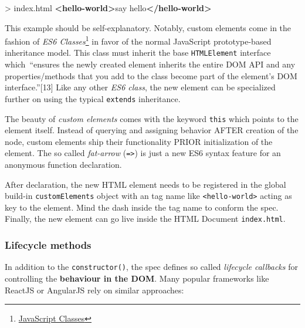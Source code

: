 \documentclass[]{article}
\newenvironment{Shaded}{}{}
\newcommand{\KeywordTok}[1]{\textcolor[rgb]{0.00,0.44,0.13}{\textbf{{#1}}}}
\newcommand{\NormalTok}[1]{{#1}}
\begin{document}
\begin{Shaded}
\begin{Highlighting}[]
\NormalTok{> index.html}
\KeywordTok{<hello-world>}\NormalTok{say hello}\KeywordTok{</hello-world>}
\end{Highlighting}
\end{Shaded}

This example should be self-explanatory. Notably, custom elements come
in the fashion of \emph{ES6 Classes}\footnote{\href{https://developer.mozilla.org/en/docs/Web/JavaScript/Reference/Classes}{JavaScript
  Classes}} in favor of the normal JavaScript prototype-based
inheritance model. This class must inherit the base \texttt{HTMLElement}
interface which~``ensures the newly created element inherits the entire
DOM API and any properties/methods that you add to the class become part
of the element's DOM interface.''{[}13{]} Like any other \emph{ES6
class}, the new element can be specialized further on using the typical
\texttt{extends} inheritance.

The beauty of \emph{custom elements} comes with the keyword
\texttt{this} which points to the element itself. Instead of querying
and assigning behavior AFTER creation of the node, custom elements ship
their functionality PRIOR initialization of the element. The so called
\emph{fat-arrow} (\texttt{=\textgreater{}}) is just a new ES6 syntax
feature for an anonymous function declaration.

After declaration, the new HTML element needs to be registered in the
global build-in \texttt{customElements} object with an tag name like
\texttt{\textless{}hello-world\textgreater{}} acting as key to the
element. Mind the dash inside the tag name to conform the spec. Finally,
the new element can go live inside the HTML Document
\texttt{index.html}.

\subsubsection{Lifecycle methods}\label{lifecycle-methods}

In addition to the \texttt{constructor()}, the spec defines so called
\emph{lifecycle callbacks} for controlling the \textbf{behaviour in the
DOM}. Many popular frameworks like ReactJS or AngularJS rely on similar
approaches:
\end{document}
